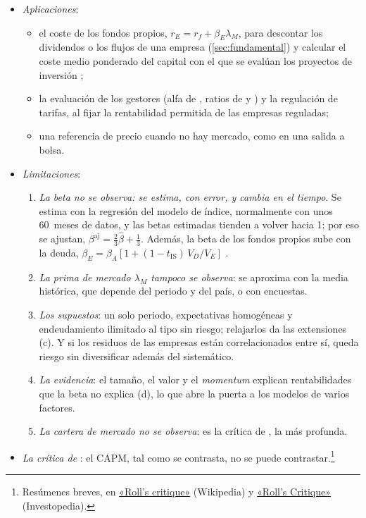 \documentclass[11pt]{article}
\begin{document}
\begin{itemize}
\item \emph{Aplicaciones}:
  \begin{itemize}
  \item el coste de los fondos propios, $r_E=r_f+\beta_E\lambda_M$, para descontar los dividendos o los flujos de una empresa (\ref{sec:fundamental}) y calcular el coste medio ponderado del capital con el que se evalúan los proyectos de inversión ;
  \item la evaluación de los gestores (alfa de , ratios de  y ) y la regulación de tarifas, al fijar la rentabilidad permitida de las empresas reguladas;
  \item una referencia de precio cuando no hay mercado, como en una salida a bolsa.
  \end{itemize}
\item \emph{Limitaciones}:
  \begin{enumerate}
  \item \emph{La beta no se observa: se estima, con error, y cambia en el tiempo}. Se estima con la regresión del modelo de índice, normalmente con unos 60~meses de datos, y las betas estimadas tienden a volver hacia 1; por eso se ajustan, $\beta^{\mathrm{aj}}=\tfrac23\hat\beta+\tfrac13$\nocite{Blume1975Betas}. Además, la beta de los fondos propios sube con la deuda, $\beta_E=\beta_A\left[1+(1-t_{\mathrm{IS}})\,V_D/V_E\right]$\nocite{Hamada1972Effect} .
  \item \emph{La prima de mercado $\lambda_M$ tampoco se observa}: se aproxima con la media histórica, que depende del periodo y del país, o con encuestas.
  \item \emph{Los supuestos}: un solo periodo, expectativas homogéneas y endeudamiento ilimitado al tipo sin riesgo; relajarlos da las extensiones (c). Y si los residuos de las empresas están correlacionados entre sí, queda riesgo sin diversificar además del sistemático.
  \item \emph{La evidencia}: el tamaño, el valor y el \emph{momentum} explican rentabilidades que la beta no explica (d), lo que abre la puerta a los modelos de varios factores.
  \item \emph{La cartera de mercado no se observa}: es la crítica de , la más profunda.
  \end{enumerate}
\item \emph{La crítica de }\nocite{Roll1977Critique}: el CAPM, tal como se contrasta, no se puede contrastar.\footnote{Resúmenes breves, en \href{https://en.wikipedia.org/wiki/Roll\%27s_critique}{«Roll's critique»} (Wikipedia) y \href{https://www.investopedia.com/terms/r/rollscritique.asp}{«Roll's Critique»} (Investopedia).}

\end{itemize}
\end{document}
